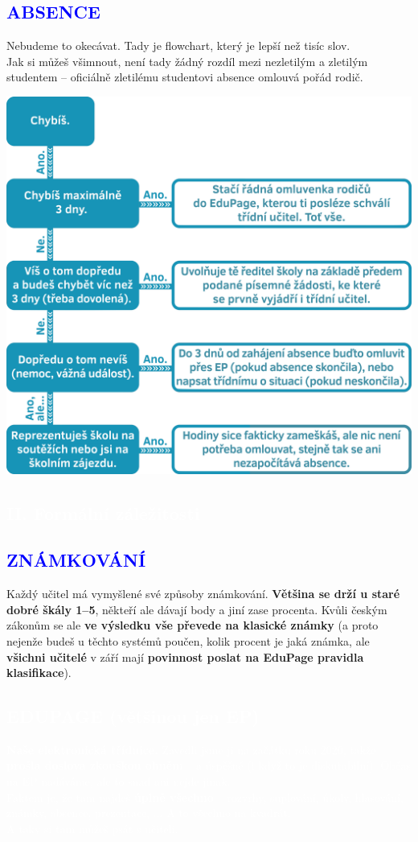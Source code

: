\documentclass[a5paper, twoside]{article}
\newcommand{\polonadpis}[4]{
  \vspace*{-50pt}
  \begin{tcolorbox}[colback = #2, boxrule = 0pt, grow to left by = #4,  grow to right by = #4, arc=8pt, height = 30pt]
    \vspace*{5pt}
    \centering \subsection*{\textcolor{#3}{#1}}
  \end{tcolorbox}
}
\newcommand{\podnadpis}[2]{
  \subsection*{\textcolor{#2}{#1}}
}
\begin{document}
\podnadpis{ABSENCE}{blue}
Nebudeme to okecávat. Tady je flowchart, který je lepší než tisíc slov. \\
\noindent Jak si můžeš všimnout, není tady žádný rozdíl mezi nezletilým a zletilým studentem -- oficiálně zletilému studentovi absence omlouvá pořád rodič.
\begin{center}
	\includegraphics[width=\linewidth]{absence.png}
\end{center}

\vspace{3em}
\pagebreak

\polonadpis{II. Formální záležitosti}{blue}{white}{-3.8cm}

\podnadpis{ZNÁMKOVÁNÍ}{blue}
Každý učitel má vymyšlené své způsoby známkování. \textbf{Většina se drží u staré dobré škály 1--5}, někteří ale dávají body a jiní zase procenta. Kvůli českým zákonům se ale \textbf{ve výsledku vše převede na klasické známky} (a proto nejenže budeš u těchto  systémů poučen, kolik procent je jaká známka, ale \textbf{všichni učitelé} v září mají \textbf{povinnost poslat na EduPage pravidla klasifikace}).

\begin{bluebox}
  \vspace*{-8pt}
	\textcolor{white}{\subsection*{EDUPAGE (většinou jen EP)}
		\textbf{Naše elektronická třídnice.} Zavedli jsme ji na začátku roku 2020, takže \textbf{prošla doslova zkouškou ohněm} -- a úspěšně (i když to je diskutabilní). Občas na EP nadáváme, ale to snad ani
		nejde jinak. \\
		Faktem je, že tam najdeš \textbf{úplně všechno} -- rozvrhy, suplování, úkoly, hlasování, známky, absence, prezentace, ... A to všechno na kvadrát. \\
		A taky si tam můžeš psát s učiteli.
	}
\end{bluebox}
\end{document}
